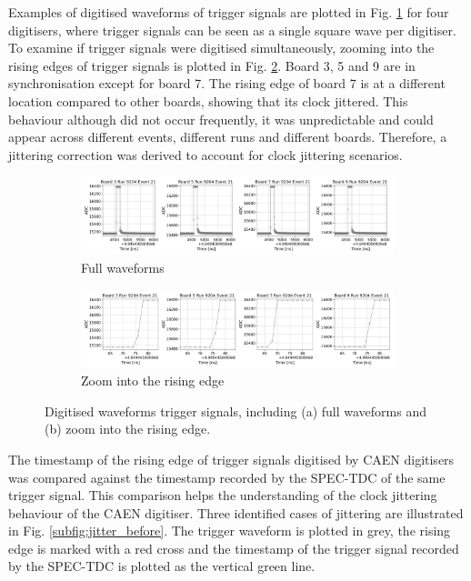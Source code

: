 Examples of digitised waveforms of trigger signals are plotted in Fig. \ref{fig:full_wfm} for four digitisers, where trigger signals can be seen as a single square wave per digitiser.
To examine if trigger signals were digitised simultaneously, zooming into the rising edges of trigger signals is plotted in Fig. \ref{fig:zoom_edge}.
Board 3, 5 and 9 are in synchronisation except for board 7.
The rising edge of board 7 is at a different location compared to other boards, showing that its clock jittered.
This behaviour although did not occur frequently, it was unpredictable and could appear across different events, different runs and different boards. 
Therefore, a jittering correction was derived to account for clock jittering scenarios.

\begin{figure}[ht!]
\begin{subfigure}[h]{1.00\linewidth}
\centering    
\includegraphics[width=\linewidth]{jitter_before_unzoom}
\caption{Full waveforms}
\label{fig:full_wfm}
\end{subfigure}
\vspace{0.5cm}
\begin{subfigure}[h]{1.00\linewidth}
\centering    
\includegraphics[width=\linewidth]{jitter_before_zoom}
\caption{Zoom into the rising edge}
\label{fig:zoom_edge}
\end{subfigure}%

\caption[Digisted Waveforms of Trigger Signals]{
Digitised waveforms trigger signals, including (a) full waveforms and (b) zoom into the rising edge.
}
\label{fig:trig_wfm}
\end{figure}

The timestamp of the rising edge of trigger signals digitised by CAEN digitisers was compared against the timestamp recorded by the SPEC-TDC of the same trigger signal.
This comparison helps the understanding of the clock jittering behaviour of the CAEN digitiser. 
Three identified cases of jittering are illustrated in Fig. \ref{subfig:jitter_before}.
The trigger waveform is plotted in grey, the rising edge is marked with a red cross and the timestamp of the trigger signal recorded by the SPEC-TDC is plotted as the vertical green line.

